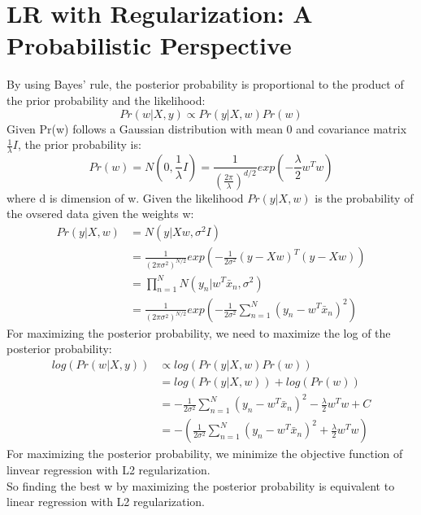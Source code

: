 \documentclass{article}
\begin{document}
\section{LR with Regularization: A Probabilistic Perspective}
By using Bayes' rule, the posterior probability is proportional to the product of the prior probability and the likelihood: \\
\[
    Pr(w|X, y) \propto Pr(y|X, w)Pr(w)
\]
Given Pr(w) follows a Gaussian distribution with mean 0 and covariance matrix $\frac{1}{\lambda}I$, the prior probability is: \\    
\[
    Pr(w) = N(0, \frac{1}{\lambda}I) = \frac{1}{(\frac{2\pi}{\lambda})^{d/2}}exp(-\frac{\lambda}{2}w^{T}w)
\]
where d is dimension of w.
Given the likelihood $Pr(y|X,w)$ is the probability of the ovsered data given the weights w:
\[
    \begin{aligned}
        Pr(y|X,w) &= N(y|Xw, \sigma^{2}I) \\
        &= \frac{1}{(2\pi\sigma^{2})^{N/2}}exp(-\frac{1}{2\sigma^{2}}(y-Xw)^{T}(y-Xw)) \\
        &= \prod_{n=1}^{N} N(y_{n}|w^{T}\bar{x}_{n}, \sigma^{2}) \\
        &= \frac{1}{(2\pi\sigma^{2})^{N/2}}exp(-\frac{1}{2\sigma^{2}}\sum_{n=1}^{N}(y_{n}-w^{T}\bar{x}_{n})^{2})
    \end{aligned}
\]
For maximizing the posterior probability, we need to maximize the log of the posterior probability:
\[
    \begin{aligned}
        log(Pr(w|X, y)) &\propto log(Pr(y|X, w)Pr(w)) \\
        &= log(Pr(y|X, w)) + log(Pr(w)) \\
        &= -\frac{1}{2\sigma^{2}}\sum_{n=1}^{N}(y_{n}-w^{T}\bar{x}_{n})^{2} - \frac{\lambda}{2}w^{T}w + C \\
        &= -(\frac{1}{2\sigma^{2}}\sum_{n=1}^{N}(y_{n}-w^{T}\bar{x}_{n})^{2} + \frac{\lambda}{2}w^{T}w )
    \end{aligned}
\]
For maximizing the posterior probability, we minimize the objective function of linvear regression with L2 regularization. \\
So finding the best w by maximizing the posterior probability is equivalent to linear regression with L2 regularization. \\
\end{document}
